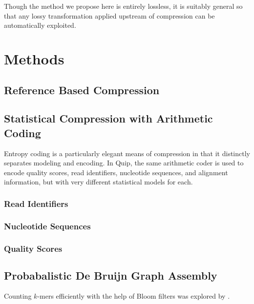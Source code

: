 \documentclass[twocolumn]{article}
\begin{document}


Though the method we propose here is entirely lossless, it is suitably general
so that any lossy transformation applied upstream of compression can be
automatically exploited.



\section{Methods}

\subsection{Reference Based Compression}

\subsection{Statistical Compression with Arithmetic Coding}

Entropy coding is a particularly elegant means of compression in that it
distinctly separates modeling and encoding. In Quip, the same arithmetic coder
is used to encode quality scores, read identifiers, nucleotide sequences, and
alignment information, but with very different statistical models for each.



\subsubsection{Read Identifiers}

\subsubsection{Nucleotide Sequences}

\subsubsection{Quality Scores}


\subsection{Probabalistic De Bruijn Graph Assembly}


Counting $k$-mers efficiently with the help of Bloom filters was explored by
\citet{Melsted2011}.
\end{document}
